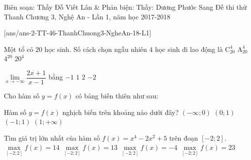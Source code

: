 
\begin{name}
{Biên soạn: Thầy Đỗ Viết Lân \& Phản biện: Thầy: Dương Phước Sang}
{Đề thi thử Thanh Chương 3, Nghệ An - Lần 1, năm học 2017-2018}
\end{name}
\setcounter{ex}{0}\setcounter{bt}{0}
[ans/ans-2-TT-46-ThanhChuong3-NgheAn-18-L1]
\setcounter{ex}{0}


\begin{ex}%
Một tổ có $20$ học sinh. Số cách chọn ngẫu nhiên $4$ học sinh đi lao động là
\choice
{\True $\mathrm{C}^4_{20}$}
{$\mathrm{A}^4_{20}$}
{$4^{20}$}
{$20^4$}
\end{ex}  

\begin{ex}%
$\lim\limits_{x \to -\infty}\dfrac{2x+1}{x-1}$ bằng
\choice
{$-1$}
{$1$}
{\True $2$}
{$-2$}
\end{ex}

\begin{ex}%
Cho hàm số $y=f(x)$ có bảng biến thiên như sau:
\begin{center}
\end{center}
Hàm số $y=f(x)$ nghịch biến trên khoảng nào dưới đây?
\choice
{$\left(-\infty ; 0\right)$}
{\True $\left(0;1\right)$}
{$\left(-1;1\right)$}
{$\left(1;+\infty\right)$}
\end{ex}  

\begin{ex}%
Tìm giá trị lớn nhất của hàm số $f(x)=x^4-2x^2+5$ trên đoạn $[-2;2].$
\choice
{$\max\limits_{[-2;2]}f(x)=14$}
{\True $\max\limits_{[-2;2]}f(x)=13$}
{$\max\limits_{[-2;2]}f(x)=-4$}
{$\max\limits_{[-2;2]}f(x)=23$}
\end{ex}

